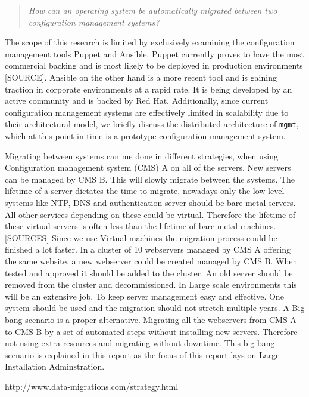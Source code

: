 \begin{quote}
\textit{How can an operating system be automatically migrated between two configuration management systems?}
\end{quote}

\noindent
The scope of this research is limited by exclusively examining the configuration management tools Puppet and Ansible. Puppet currently proves to have the most commercial backing and is most likely to be deployed in production environments [SOURCE]. Ansible on the other hand is a more recent tool and is gaining traction in corporate environments at a rapid rate. It is being developed by an active community and is backed by Red Hat. Additionally, since current configuration management systems are effectively limited in scalability due to their architectural model, we briefly discuss the distributed architecture of \texttt{mgmt}, which at this point in time is a prototype configuration management system.

Migrating between systems can me done in different strategies, when using Configuration management system (CMS) A on all of the servers. New servers can be managed by CMS B. This will slowly migrate between the systems. The lifetime of a server dictates the time to migrate, nowadays only the low level systems like NTP, DNS and authentication server should be bare metal servers. All other services depending on these could be virtual. Therefore the lifetime of these virtual servers is often less than the lifetime of bare metal machines. [SOURCES] Since we use Virtual machines the migration process could be finished a lot faster. In a cluster of 10 webservers managed by CMS A offering the same website, a new webserver could be created managed by CMS B. When tested and approved it should be added to the cluster. An old server should be removed from the cluster and decommissioned. In Large scale environments this will be an extensive job.
To keep server management easy and effective. One system should be used and the migration should not stretch multiple years. A Big bang scenario is a proper alternative. Migrating all the webservers from CMS A to CMS B by a set of automated steps without installing new servers. Therefore not using extra resources and migrating without downtime. This big bang scenario is explained in this report as the focus of this report lays on Large Installation Adminstration.
     
http://www.data-migrations.com/strategy.html

